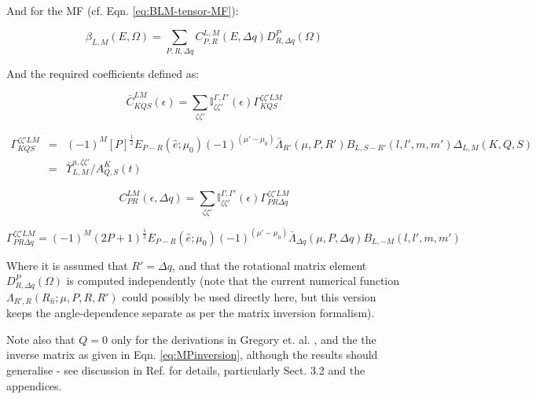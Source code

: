 
And for the MF (cf. Eqn. \ref{eq:BLM-tensor-MF}):

\begin{equation}
\beta_{L,M}(E,\Omega)=\sum_{P,R,\Delta q}C_{P,R}^{L,M}(E,\Delta q)D_{R,\Delta q}^{P}(\Omega)
\end{equation}

And the required coefficients defined as:

\begin{equation}
\bar{C}_{KQS}^{LM}(\epsilon)=\sum_{\zeta\zeta'}\mathbb{I}_{\zeta\zeta'}^{\Gamma,\Gamma'}(\epsilon)\Gamma_{KQS}^{\zeta\zeta'LM}
\end{equation}

\begin{eqnarray}
\Gamma_{KQS}^{\zeta\zeta'LM} & = & (-1)^{M}[P]^{\frac{1}{2}}E_{P-R}(\hat{e};\mu_{0})(-1)^{(\mu'-\mu_{0})}\bar{\Lambda}_{R'}(\mu,P,R')B_{L,S-R'}(l,l',m,m')\Delta_{L,M}(K,Q,S)\\
 & = & \bar{\varUpsilon}_{L,M}^{u,\zeta\zeta'}/A_{Q,S}^{K}(t)
\end{eqnarray}

\begin{equation}
C_{PR}^{LM}(\epsilon,\Delta q)=\sum_{\zeta\zeta'}\mathbb{I}_{\zeta\zeta'}^{\Gamma,\Gamma'}(\epsilon)\Gamma_{PR\Delta q}^{\zeta\zeta'LM}
\end{equation}

\begin{equation}
\Gamma_{PR\Delta q}^{\zeta\zeta'LM}=(-1)^{M}(2P+1)^{\frac{1}{2}}E_{P-R}(\hat{e};\mu_{0})(-1)^{(\mu'-\mu_{0})}\bar{\Lambda}_{\Delta q}(\mu,P,\Delta q)B_{L,-M}(l,l',m,m')
\end{equation}

Where it is assumed that $R'=\Delta q$, and that the rotational matrix element $D_{R,\Delta q}^{P}(\Omega)$
is computed independently (note that the current numerical function $\Lambda_{R',R}(R_{\hat{n}};\mu,P,R,R')$
could possibly be used directly here, but this version keeps the angle-dependence
separate as per the matrix inversion formalism).

Note also that $Q=0$ only for the derivations in Gregory et. al. \cite{gregory2021MolecularFramePhotoelectron}, and the the inverse matrix as given in Eqn. \ref{eq:MPinversion}, although the results should generalise - see discussion in Ref. \cite{gregory2021MolecularFramePhotoelectron} for details, particularly Sect. 3.2 and the appendices.